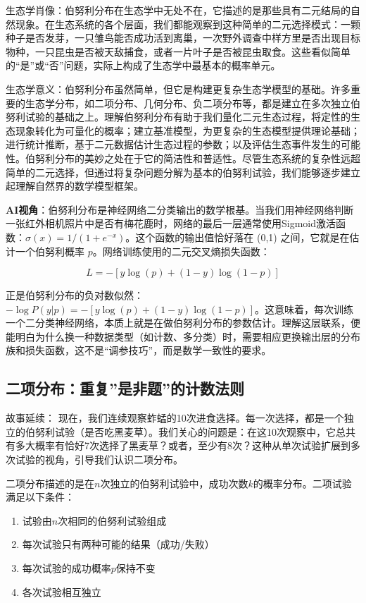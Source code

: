 \documentclass[
  twoside,12pt,fontset=none]{ctexbook}
\providecommand{\tightlist}{%
  \setlength{\itemsep}{0pt}\setlength{\parskip}{0pt}}
\begin{document}
生态学肖像：伯努利分布在生态学中无处不在，它描述的是那些具有二元结局的自然现象。在生态系统的各个层面，我们都能观察到这种简单的二元选择模式：一颗种子是否发芽，一只雏鸟能否成功活到离巢，一次野外调查中样方里是否出现目标物种，一只昆虫是否被天敌捕食，或者一片叶子是否被昆虫取食。这些看似简单的``是''或``否''问题，实际上构成了生态学中最基本的概率单元。

生态学意义：伯努利分布虽然简单，但它是构建更复杂生态学模型的基础。许多重要的生态学分布，如二项分布、几何分布、负二项分布等，都是建立在多次独立伯努利试验的基础之上。理解伯努利分布有助于我们量化二元生态过程，将定性的生态现象转化为可量化的概率；建立基准模型，为更复杂的生态模型提供理论基础；进行统计推断，基于二元数据估计生态过程的参数；以及评估生态事件发生的可能性。伯努利分布的美妙之处在于它的简洁性和普适性。尽管生态系统的复杂性远超简单的二元选择，但通过将复杂问题分解为基本的伯努利试验，我们能够逐步建立起理解自然界的数学模型框架。

\textbf{AI视角}：伯努利分布是神经网络二分类输出的数学根基。当我们用神经网络判断一张红外相机照片中是否有梅花鹿时，网络的最后一层通常使用Sigmoid激活函数：\(\sigma(x) = 1/(1+e^{-x})\)。这个函数的输出值恰好落在 (0,1) 之间，它就是在估计一个伯努利概率 \(p\)。网络训练使用的二元交叉熵损失函数：

\[L = -[y \log(p) + (1-y) \log(1-p)]\]

正是伯努利分布的负对数似然：\(-\log P(y|p) = -[y \log(p) + (1-y) \log(1-p)]\)。这意味着，每次训练一个二分类神经网络，本质上就是在做伯努利分布的参数估计。理解这层联系，便能明白为什么换一种数据类型（如计数、多分类）时，需要相应更换输出层的分布族和损失函数，这不是``调参技巧''，而是数学一致性的要求。

\hypertarget{ux4e8cux9879ux5206ux5e03ux91cdux590dux662fux975eux9898ux7684ux8ba1ux6570ux6cd5ux5219}{%
\subsection{二项分布：重复''是非题''的计数法则}\label{ux4e8cux9879ux5206ux5e03ux91cdux590dux662fux975eux9898ux7684ux8ba1ux6570ux6cd5ux5219}}

故事延续： 现在，我们连续观察蚱蜢的10次进食选择。每一次选择，都是一个独立的伯努利试验（是否吃黑麦草）。我们关心的问题是：在这10次观察中，它总共有多大概率有恰好7次选择了黑麦草？或者，至少有8次？这种从单次试验扩展到多次试验的视角，引导我们认识二项分布。

二项分布描述的是在\(n\)次独立的伯努利试验中，成功次数\(k\)的概率分布。二项试验满足以下条件：

\begin{enumerate}
\def\labelenumi{\arabic{enumi}.}
\tightlist
\item
  试验由\(n\)次相同的伯努利试验组成
\item
  每次试验只有两种可能的结果（成功/失败）
\item
  每次试验的成功概率\(p\)保持不变
\item
  各次试验相互独立
\end{enumerate}
\end{document}
